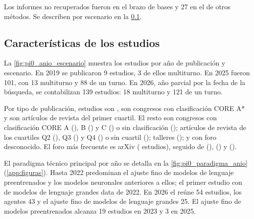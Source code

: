 Los informes no recuperados fueron \nNoRecuperados{} en el brazo de bases y 27 en el de otros métodos. Se describen por escenario en la \cref{sec:res-caracteristicas}.

\subsection{Características de los estudios}
\label{sec:res-caracteristicas}



La \cref{fig:pi0_anio_escenario} muestra los \nEstudios{} estudios por año de publicación y escenario. En 2019 se publicaron 9 estudios, 3 de ellos multiturno. En 2025 fueron 101, con 13 multiturno y 88 de un turno. En 2026, año parcial por la fecha de la búsqueda, se contabilizan 139 estudios: 18 multiturno y 121 de un turno.

Por tipo de publicación, \nForoPreprint{} estudios son , \nForoCongresoAestrella{} son congresos con clasificación CORE A* y \nForoRevistaQUno{} son artículos de revista del primer cuartil. El resto son congresos con clasificación CORE A (\nForoCongresoA{}), B (\nForoCongresoB{}) y C (\nForoCongresoC{}) o sin clasificación (\nForoCongresoSinRanking{}); artículos de revista de los cuartiles Q2 (\nForoRevistaQDos{}), Q3 (\nForoRevistaQTres{}) y Q4 (\nForoRevistaQCuatro{}) o sin cuartil (\nForoRevistaSinRanking{}); talleres (\nForoTallerSinRanking{}); y \nForoDesconocido{} con foro desconocido. El foro más frecuente es arXiv (\nVenueUno{} estudios), seguido de  (\nVenueDos{}),  (\nVenueTres{}) y  (\nVenueCuatro{}).

El paradigma técnico principal por año se detalla en la \cref{fig:pi0_paradigma_anio} (\cref{app:figuras}). Hasta 2022 predominan el ajuste fino de modelos de lenguaje preentrenados y los modelos neuronales anteriores a ellos; el primer estudio con  de modelos de lenguaje grandes data de 2022. En 2026 el  reúne 54 estudios, los agentes 43 y el ajuste fino de modelos de lenguaje grandes 25. El ajuste fino de modelos preentrenados alcanza 19 estudios en 2023 y 3 en 2025.

